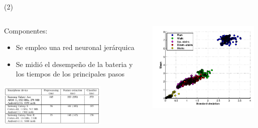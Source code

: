 \begin{frame}{ \footnotemark (2) }
\begin{columns}
\begin{column}{0.40\textwidth}
		Componentes:
		\begin{itemize}
		\item Se empleo una red neuronal jerárquica
		\item Se midió el desempeño de la bateria y los tiempos de los principales pasos
		\end{itemize}
\begin{center}
     \includegraphics[width=0.7\textwidth]{Figs/DeteccionActividad3}
     
     \end{center}
\end{column}
\begin{column}{0.29\textwidth}  
    \begin{center}
     \includegraphics[width=0.97\textwidth]{Figs/DeteccionActividad2}


\end{center}
\end{column}
\end{columns}
\end{frame}
